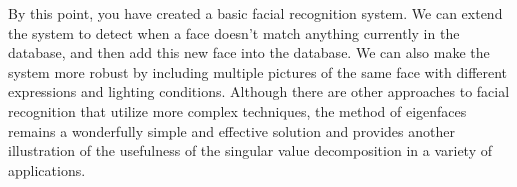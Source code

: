 By this point, you have created a basic facial recognition system.
We can extend the system to detect when a face doesn't match anything currently in the database, and then add this new face into the database.
We can also make the system more robust by including multiple pictures of the same face with different expressions and lighting conditions.
Although there are other approaches to facial recognition that utilize more complex techniques, the method of eigenfaces remains
a wonderfully simple and effective solution and provides another illustration of the usefulness of the singular value decomposition in a variety of applications.


